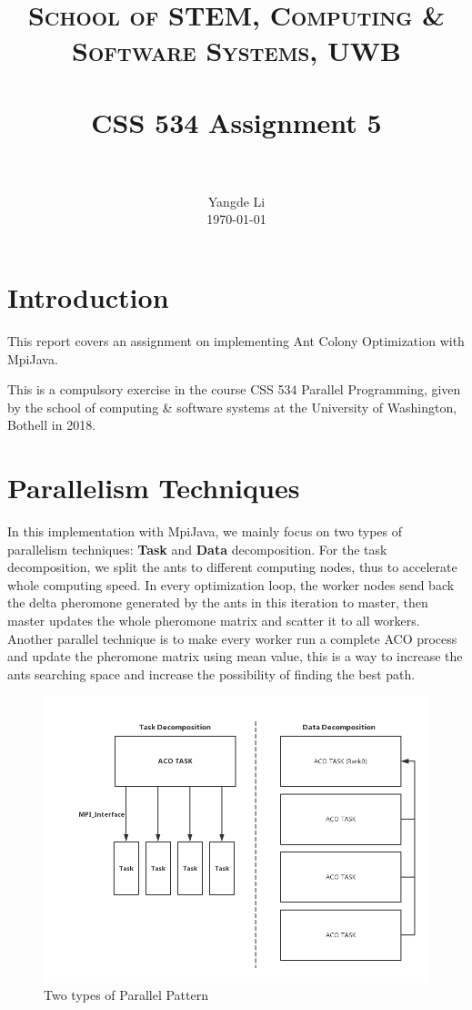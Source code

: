 \documentclass[11pt,a4paper]{report}
\title{
	\usefont{OT1}{bch}{b}{n}
	\normalfont \normalsize \textsc{School of STEM, Computing \& Software Systems, UWB } \\ [25pt]
	\horrule{0.5pt} \\[0.4cm]
	\huge CSS 534 Assignment 5 \\
	\horrule{2pt} \\[0.5cm]
}
\author{
	\normalfont 								\normalsize
	Yangde Li\\[-3pt]		\normalsize
	\today
}
\date{}
\begin{document}
\maketitle
\tableofcontents
\newpage

\section{Introduction}
This report covers an assignment on implementing Ant Colony Optimization with MpiJava.
\newline

\noindent
This is a compulsory exercise in the course CSS 534 Parallel Programming, given by the school of computing \& software systems at the University of Washington, Bothell in 2018.


\section{Parallelism Techniques}
In this implementation with MpiJava, we mainly focus on two types of parallelism techniques: \textbf{Task} and \textbf{Data} decomposition. For the task decomposition, we split the ants to different computing nodes, thus to accelerate whole computing speed. In every optimization loop, the worker nodes send back the delta pheromone generated by the ants in this iteration to master, then master updates the whole pheromone matrix and scatter it to all workers. Another parallel technique is to make every worker run a complete ACO process and update the pheromone matrix using mean value, this is a way to increase the ants searching space and increase the possibility of finding the best path.
\begin{figure}[!htp]
	\centering
	\includegraphics[width=0.8\linewidth]{parallel}
	\caption{Two types of Parallel Pattern}
	\label{fig:parallel}
\end{figure}
\end{document}
